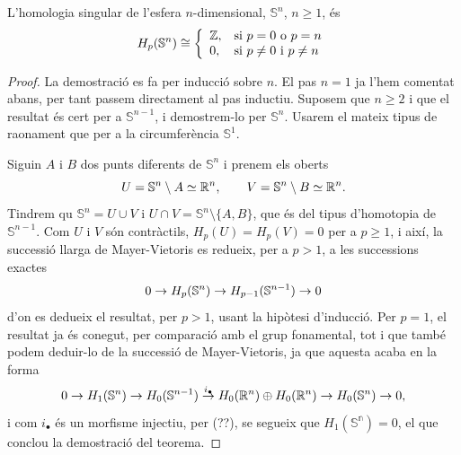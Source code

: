 \documentclass[../main.tex]{subfiles}
\begin{document}
\begin{ter}
\label{ter:homologiaesfera} L'homologia singular de l'esfera $n$-dimensional, $\mathbb{S}^n$, $n\geq 1$, és 
\begin{equation}
    \notag
    H_p(\mathbb{S}^n)\cong\left\{
    \begin{array}{ll}
        \mathbb{Z}, & \text{si $p=0$ o $p = n$} \\
        0, & \text{si $p\not=0$ i $p\not=n$}
    \end{array}
    \right.
\end{equation}
\end{ter}
\begin{proof}
La demostració es fa per inducció sobre $n$. El pas $n = 1$ ja l'hem comentat abans, per tant passem directament al pas inductiu. Suposem que $n\geq 2$ i que el resultat és cert per a $\mathbb{S}^{n-1}$, i demostrem-lo per $\mathbb{S}^n$. Usarem el mateix tipus de raonament que per a la circumferència $\mathbb{S}^1$.

Siguin $A$ i $B$ dos punts diferents de $\mathbb{S}^n$ i prenem els oberts
\begin{equation}
    \notag
    U = \mathbb{S}^n\setminus A\simeq \mathbb{R}^n,\qquad V = \mathbb{S}^n\setminus B\simeq \mathbb{R}^n.
\end{equation}
Tindrem qu $\mathbb{S}^n=U\cup V$ i $U\cap V = \mathbb{S}^n\setminus\{A,B\}$, que és del tipus d'homotopia de $\mathbb{S}^{n-1}$. Com $U$ i $V$ són contràctils, $H_p(U) = H_p(V) = 0$ per a $p\geq 1$, i així, la successió llarga de Mayer-Vietoris es redueix, per a $p>1$, a les successions exactes
\begin{equation}
    \notag
    0\rightarrow H_p(\mathbb{S}^n)\rightarrow H_{p-1}(\mathbb{S}^{n-1})\rightarrow 0
\end{equation}
d'on es dedueix el resultat, per $p>1$, usant la hipòtesi d'inducció. Per $p = 1$, el resultat ja és conegut, per comparació amb el grup fonamental, tot i que també podem deduir-lo de la successió de Mayer-Vietoris, ja que aquesta acaba en la forma
\begin{equation}
    \notag
    0\rightarrow H_1(\mathbb{S}^n)\rightarrow H_0(\mathbb{S}^{n-1})\overset{i_\bullet}{\rightarrow}H_0(\mathbb{R}^n)\oplus H_0(\mathbb{R}^n)\rightarrow H_0(\mathbb{S}^n)\rightarrow 0,
\end{equation}
i com $i_\bullet$ és un morfisme injectiu, per (??), se segueix que $H_1(\mathbb{S^n}) = 0$, el que conclou la demostració del teorema.
\end{proof}
\end{document}
